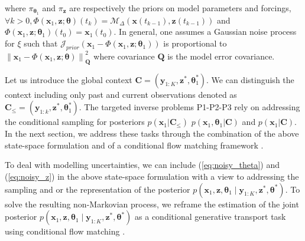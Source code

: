 \documentclass[10pt]{article}
\begin{document}
where $\pi_{\mathbf{\theta}_1}$ and $\pi_{\mathbf{z}}$ are respectively the priors on model parameters and forcings, $\forall k>0, \Phi \left (  \mathbf{x}_1 , \mathbf{z} ; \mathbf{\theta} \right )\left ( t_{k} \right ) = \mathcal{M}_\Delta \left ( \mathbf{x}\left ( t_{k-1} \right ) , \mathbf{z} \left ( t_{k-1} \right ) \right )$ and $\Phi \left (  \mathbf{x}_1 , \mathbf{z} ; \mathbf{\theta}_1 \right )\left ( t_{0} \right )=\mathbf{x}_1 \left ( t_{0} \right )$. In general, one assumes a Gaussian noise process for $\xi$ such that $\mathcal{J}_{prior} \left ( \mathbf{x}_1 - \Phi \left (  \mathbf{x}_1 , \mathbf{z} ; \mathbf{\theta}_1 \right ) \right )$ is proportional to $\left \| \mathbf{x}_1 - \Phi \left (  \mathbf{x}_1 , \mathbf{z} ; \mathbf{\theta} \right )\right \|^2_\mathbf{Q}$ where covariance $\mathbf{Q}$ is the model error covariance.


Let us introduce the global context 
 $\mathbf{C} = (\mathbf{y}_{1:K}, \mathbf{z}^*, \mathbf{\theta}_1^* )$. We can distinguish the context including only past and current observations denoted as $\mathbf{C}_\leq = (\mathbf{y}_{1:k}, \mathbf{z}^*, \mathbf{\theta}_1^* )$. The targeted inverse problems P1-P2-P3 rely on addressing the conditional sampling for posteriors $p(\mathbf{x}_1 | \mathbf{C}_\leq)$ $p(\mathbf{x}_1,\mathbf{\theta}_1 | \mathbf{C})$ and $p(\mathbf{x}_1 | \mathbf{C})$. In the next section, we address these tasks through the combination of the above state-space formulation and of a conditional flow matching framework \cite{albergo_stochastic_2025,lipman_flow_2023}.

To deal with modelling uncertainties, we can include (\ref{eq:noisy_theta}) and (\ref{eq:noisy_z}) in the above state-space formulation with a view to addressing the sampling and or the representation of the posterior $p(\mathbf{x}_1,\mathbf{z},\mathbf{\theta}_1 \mid \mathbf{y}_{1:K}, \mathbf{z}^*, \mathbf{\theta}^*)$. To solve the resulting non-Markovian process, we reframe the estimation of the joint posterior $p(\mathbf{x}_1,\mathbf{z},\mathbf{\theta}_1 \mid \mathbf{y}_{1:K}, \mathbf{z}^*, \mathbf{\theta}^*)$ as a conditional generative transport task using conditional flow matching \cite{albergo_stochastic_2025,lipman_flow_2023}.
\end{document}
